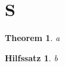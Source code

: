 \documentclass{llncs}
\newtheorem{theorem}{Theorem}[section]
\newtheorem{mylemma}{Lemma}
\newtheorem{mylemma}{Hilfssatz}
\begin{document}
\section{S}
\begin{theorem}a\end{theorem}
\begin{mylemma}b\end{mylemma}
\end{document}
